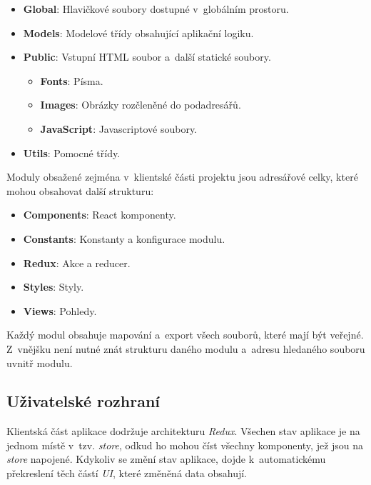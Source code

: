 \documentclass[a4paper,12pt]{article}
\begin{document}
\begin{itemize}
\begin{itemize}
\item \textbf{Global}: Hlavičkové soubory dostupné v~globálním prostoru.
\item \textbf{Models}: Modelové třídy obsahující aplikační logiku.
\item \textbf{Public}: Vstupní HTML soubor a~další statické soubory.

\begin{itemize}
\item \textbf{Fonts}: Písma.
\item \textbf{Images}: Obrázky rozčleněné do podadresářů.
\item \textbf{JavaScript}: Javascriptové soubory.
\end{itemize} 

\item \textbf{Utils}:  Pomocné třídy.
\end{itemize} 

\end{itemize} 

Moduly obsažené zejména v~klientské části projektu jsou adresářové celky, které mohou obsahovat další strukturu:

\begin{itemize}
\item \textbf{Components}: React komponenty.
\item \textbf{Constants}: Konstanty a konfigurace modulu.
\item \textbf{Redux}: Akce a reducer.
\item \textbf{Styles}: Styly.
\item \textbf{Views}: Pohledy.
\end{itemize} 

Každý modul obsahuje mapování a~export všech souborů, které mají být veřejné. Z~vnějšku není nutné znát strukturu daného modulu a~adresu hledaného souboru uvnitř modulu.





\subsection{Uživatelské rozhraní}

Klientská část aplikace dodržuje architekturu \textit{Redux}. Všechen stav aplikace je na jednom místě v~tzv. \textit{store}, odkud ho mohou číst všechny komponenty, jež jsou na \textit{store} napojené. Kdykoliv se změní stav aplikace, dojde k~automatickému překreslení těch částí \textit{UI}, které změněná data obsahují.~\cite{reactbook}
\end{document}
